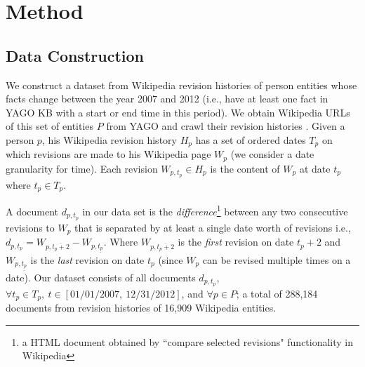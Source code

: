 \section{Method} \label{sec:method}

\subsection{Data Construction} \label{sec:data}
We construct a dataset from Wikipedia revision histories of person entities whose facts change between the year 2007 and 2012 (i.e., have at least one fact in YAGO KB with a start or end time in this period). We obtain Wikipedia URLs of this set of entities $P$ from YAGO and crawl their revision histories%
. Given a person $p$, his Wikipedia revision history $H_p$ has a set of ordered dates $T_p$ on which revisions are made to his Wikipedia page $W_p$ (we consider a date granularity for time). Each revision $W_{p, t_p} \in H_p$ is the content of $W_p$ at date $t_p$ where $t_p \in T_p$. 

A document $d_{p, t_p}$ in our data set is the \textit{difference}\footnote[2]{a HTML document obtained by ``compare selected revisions"  functionality in Wikipedia} between any two consecutive revisions to $W_p$ that is separated by at least a single date worth of revisions i.e., $d_{p, t_p} = W_{p, \overline{t_p+2}} - W_{p, \underline{t_p}}$. Where $W_{p, \overline{t_p+2}}$ is the \textit{first} revision on date $t_p+2$ and $W_{p, \underline{t_p}}$ is the \textit{last} revision on date $t_p$ (since $W_p$ can be revised multiple times on a date). Our dataset consists of all documents $d_{p, t_p}$, $\forall t_p \in T_p,\ t \in [01/01/2007,\ 12/31/2012]$, and $\forall p \in P$; a total of 288,184 documents from revision histories of 16,909 Wikipedia entities.


